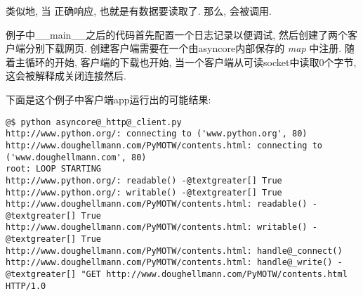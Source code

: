 \documentclass[a4paper,10pt,english]{manual}
\begin{document}
类似地, 当  正确响应, 也就是有数据要读取了. 那么,  会被调用.

例子中\_\_main\_\_之后的代码首先配置一个日志记录以便调试, 然后创建了两个客户端分别下载网页. 创建客户端需要在一个由asyncore内部保存的 \emph{map} 中注册. 随着主循环的开始, 客户端的下载也开始, 当一个客户端从可读socket中读取0个字节, 这会被解释成关闭连接然后.

下面是这个例子中客户端app运行出的可能结果:

\begin{Verbatim}[commandchars=@\[\]]
@$ python asyncore@_http@_client.py
http://www.python.org/: connecting to ('www.python.org', 80)
http://www.doughellmann.com/PyMOTW/contents.html: connecting to ('www.doughellmann.com', 80)
root: LOOP STARTING
http://www.python.org/: readable() -@textgreater[] True
http://www.python.org/: writable() -@textgreater[] True
http://www.doughellmann.com/PyMOTW/contents.html: readable() -@textgreater[] True
http://www.doughellmann.com/PyMOTW/contents.html: writable() -@textgreater[] True
http://www.doughellmann.com/PyMOTW/contents.html: handle@_connect()
http://www.doughellmann.com/PyMOTW/contents.html: handle@_write() -@textgreater[] "GET http://www.doughellmann.com/PyMOTW/contents.html HTTP/1.0


\end{Verbatim}
\end{document}
